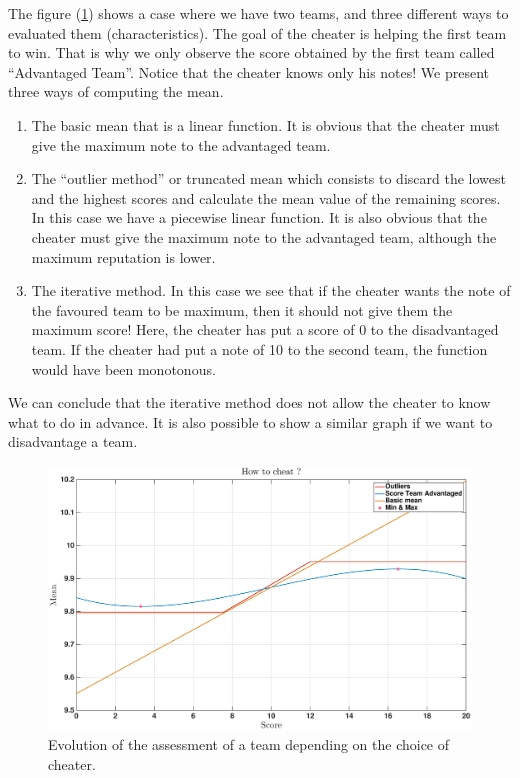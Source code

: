 \documentclass[12pt,a4paper]{article}
\newcommand{\quotes}[1]{``#1''}
\begin{document}
The figure (\ref{fig:howto}) shows a case where we have two teams, and three different ways to evaluated them (characteristics). The goal of the cheater is helping the first team to win. That is why we only observe the score obtained by the first team called \quotes{Advantaged Team}. Notice that the cheater knows only his notes! We present three ways of computing the mean.
\begin{enumerate}
    \item The basic mean that is a linear function. It is obvious that the cheater must give the maximum note to the advantaged team.
    \item The \quotes{outlier method} or truncated mean which consists to discard the lowest and the highest scores and calculate the mean value of the remaining scores. In this case we have a piecewise linear function. It is also obvious that the cheater must give the maximum note to the advantaged team, although the maximum reputation is lower.
    \item The iterative method. In this case we see that if the cheater wants the note of the favoured team to be maximum, then it should not give them the maximum score! Here, the cheater has put a score of 0 to the disadvantaged team. If the cheater had put a note of 10 to the second team, the function would have been monotonous.
\end{enumerate}
We can conclude that the iterative method does not allow the cheater to know what to do in advance. It is also possible to show a similar graph if we want to disadvantage a team.

\begin{figure}[ht!]
\centering
\includegraphics[width = 1\textwidth]{cheaters/howto.eps}
\caption{Evolution of the assessment of a team depending on the choice of cheater.}
\label{fig:howto}
\end{figure}
\end{document}
